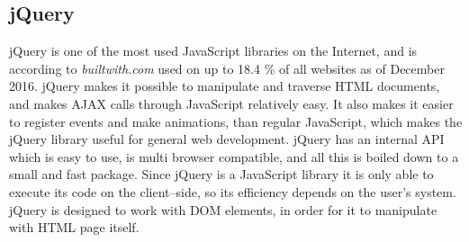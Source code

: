 \subsection{jQuery}\label{ssec:jquery}
jQuery is one of the most used JavaScript libraries on the Internet, and is according to \textit{builtwith.com} used on up to 18.4 \% of all websites as of December 2016\cite{buildwith}.
jQuery makes it possible to manipulate and traverse HTML documents, and makes \ac{AJAX} calls through JavaScript relatively easy.
It also makes it easier to register events and make animations, than regular JavaScript, which makes the jQuery library useful for general web development.
jQuery has an internal API which is easy to use, is multi browser compatible, and all this is boiled down to a small and fast package.
Since jQuery is a JavaScript library it is only able to execute its code on the client--side, so its efficiency depends on the user's system.
jQuery is designed to work with \ac{DOM} elements, in order for it to manipulate with HTML page itself.
